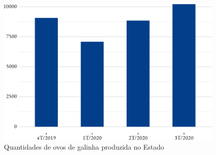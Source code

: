 \begin{figure}[h]
	\caption{Quantidades de ovos de galinha produzida no Estado}
	\includegraphics{fig/ovos_galinha-1.pdf}
\end{figure}

